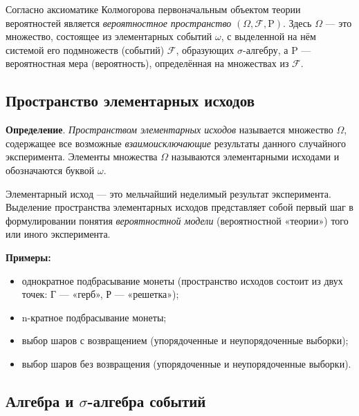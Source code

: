 \documentclass[11pt,a4paper]{article}
\providecommand{\tightlist}{%
      \setlength{\itemsep}{0pt}\setlength{\parskip}{0pt}}
\begin{document}
Согласно аксиоматике Колмогорова первоначальным объектом теории
вероятностей является \emph{вероятностное пространство}
\((\Omega, \mathcal{F}, \mathrm{P})\). Здесь \(\Omega\) --- это
множество, состоящее из элементарных событий \(\omega\), с выделенной на
нём системой его подмножеств (событий) \(\mathcal{F}\), образующих
\(\sigma\)-алгебру, а \(\mathrm{P}\) --- вероятностная мера
(вероятность), определённая на множествах из \(\mathcal{F}\).

    \hypertarget{ux43fux440ux43eux441ux442ux440ux430ux43dux441ux442ux432ux43e-ux44dux43bux435ux43cux435ux43dux442ux430ux440ux43dux44bux445-ux438ux441ux445ux43eux434ux43eux432}{%
\subsection{Пространство элементарных
исходов}\label{ux43fux440ux43eux441ux442ux440ux430ux43dux441ux442ux432ux43e-ux44dux43bux435ux43cux435ux43dux442ux430ux440ux43dux44bux445-ux438ux441ux445ux43eux434ux43eux432}}

\textbf{Определение}. \emph{Пространством элементарных исходов}
называется множество \(\Omega\), содержащее все возможные
\emph{взаимоисключающие} результаты данного случайного эксперимента.
Элементы множества \(\Omega\) называются элементарными исходами и
обозначаются буквой \(\omega\).

Элементарный исход --- это мельчайший неделимый результат
эксперимента.\\
Выделение пространства элементарных исходов представляет собой первый
шаг в формулировании понятия \emph{вероятностной модели} (вероятностной
«теории») того или иного эксперимента.

    \textbf{Примеры:}

\begin{itemize}
\tightlist
\item
  однократное подбрасывание монеты (пространство исходов состоит из двух
  точек: Г --- «герб», Р --- «решетка»);
\item
  n-кратное подбрасывание монеты;
\item
  выбор шаров с возвращением (упорядоченные и неупорядоченные выборки);
\item
  выбор шаров без возвращения (упорядоченные и неупорядоченные выборки).
\end{itemize}

    \hypertarget{ux430ux43bux433ux435ux431ux440ux430-ux438-mathbfsigma-ux430ux43bux433ux435ux431ux440ux430-ux441ux43eux431ux44bux442ux438ux439}{%
\subsection{\texorpdfstring{Алгебра и \(\sigma\)-алгебра
событий}{Алгебра и \{\textbackslash sigma\}-алгебра событий}}\label{ux430ux43bux433ux435ux431ux440ux430-ux438-mathbfsigma-ux430ux43bux433ux435ux431ux440ux430-ux441ux43eux431ux44bux442ux438ux439}}
\end{document}
